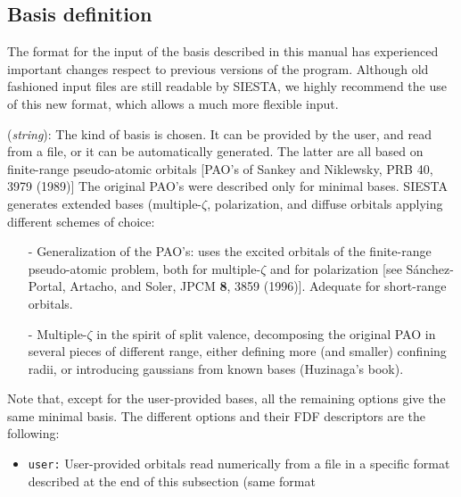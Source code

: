 \vspace{5pt}
\subsection{Basis definition}

\noindent 
The format for the input of the basis described in this manual
has experienced important changes respect to 
previous versions of the program. Although old fashioned 
input files are
still readable by SIESTA, we highly recommend the use of this
new format, which allows a much more flexible input.

\begin{description}
\itemsep 10pt
\parsep 0pt

\item[{\bf PAO.BasisType}] ({\it string}): 
The kind of basis is chosen. It can be provided by the user, and read from 
a file, or it can be automatically generated. The latter are all based
on finite-range pseudo-atomic 
orbitals
[PAO's of Sankey and Niklewsky, PRB 40, 3979 (1989)]
The original PAO's were described only for minimal bases. SIESTA generates 
extended bases (multiple-$\zeta$, 
polarization, and diffuse 
orbitals applying different schemes of choice:
\begin{itemize}
\item[-] Generalization of the PAO's: uses the excited orbitals of the
finite-range pseudo-atomic problem, both for multiple-$\zeta$ and for
polarization [see S\'anchez-Portal, Artacho, and Soler, JPCM {\bf 8}, 3859
(1996)]. Adequate for short-range orbitals.
\item[-] Multiple-$\zeta$ in the spirit of split valence, 
decomposing the original
PAO in several pieces of different range, either defining more (and smaller)
confining radii, or introducing gaussians from known 
bases (Huzinaga's book).
\end{itemize}
\noindent
Note that, except for the user-provided bases, all the remaining options
give the same minimal basis. 
The different options and their FDF descriptors are the following:
\begin{itemize}
\item {\tt user:} 
User-provided orbitals read numerically from a file in
a specific format described at the end of this subsection (same format 

\end{itemize}
\end{description}
